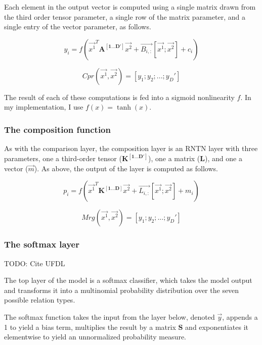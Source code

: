 \documentclass[12pt,leqno,tbtags,twoside]{article}
\theoremstyle{dotless}
\begin{document}
Each element in the output vector is computed using a single matrix drawn from the third order tensor parameter, a single row of the matrix parameter, and a single entry of the vector parameter, as follows.

\begin{equation}
y_i = f(\vec{x^1}^T \mathbf{A^{[1...D']}} \vec{x^2} + \vec{B_{i,:}} [\vec{x^1}; \vec{x^2}] + c_i)
\end{equation}

\begin{equation}
Cpr(\vec{x^1}, \vec{x^2}) = [y_1; y_2; ...; y_D']
\end{equation}

The result of each of these computations is fed into a sigmoid nonlinearity $f$. In my implementation, I use $f(x) = \tanh(x)$.


\subsubsection{The composition function}


As with the comparison layer, the composition layer is an RNTN layer with three parameters, one a third-order tensor ($\mathbf{K^{[1...D']}}$), one a matrix  ($\mathbf{L}$), and one a vector ($\vec{m}$). As above, the output of the layer is computed as follows.

\begin{equation}
p_i = f(\vec{x^1}^T \mathbf{K^{[1...D]}} \vec{x^2} + \vec{L_{i,:}} [\vec{x^1}; \vec{x^2}] + m_i)
\end{equation}

\begin{equation}
Mrg(\vec{x^1}, \vec{x^2}) = [y_1; y_2; ...; y_D']
\end{equation}


\subsubsection{The softmax layer}

TODO: Cite UFDL

The top layer of the model is a softmax classifier, which takes the model output and transforms it into a multinomial probability distribution over the seven possible relation types.

The softmax function takes the input from the layer below, denoted $\vec{y}$, appends a 1 to yield a bias term, multiplies the result by a matrix $\mathbf{S}$ and exponentiates it elementwise to yield an unnormalized probability measure.
\end{document}
